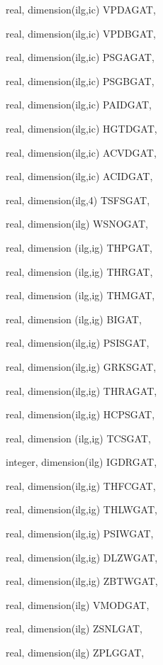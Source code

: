 {\begin{DoxyParamCaption}
\item[{real, dimension(ilg,ic)}]{V\+P\+D\+A\+G\+A\+T, }
\item[{real, dimension(ilg,ic)}]{V\+P\+D\+B\+G\+A\+T, }
\item[{real, dimension(ilg,ic)}]{P\+S\+G\+A\+G\+A\+T, }
\item[{real, dimension(ilg,ic)}]{P\+S\+G\+B\+G\+A\+T, }
\item[{real, dimension(ilg,ic)}]{P\+A\+I\+D\+G\+A\+T, }
\item[{real, dimension(ilg,ic)}]{H\+G\+T\+D\+G\+A\+T, }
\item[{real, dimension(ilg,ic)}]{A\+C\+V\+D\+G\+A\+T, }
\item[{real, dimension(ilg,ic)}]{A\+C\+I\+D\+G\+A\+T, }
\item[{real, dimension(ilg,4)}]{T\+S\+F\+S\+G\+A\+T, }
\item[{real, dimension(ilg)}]{W\+S\+N\+O\+G\+A\+T, }
\item[{real, dimension (ilg,ig)}]{T\+H\+P\+G\+A\+T, }
\item[{real, dimension (ilg,ig)}]{T\+H\+R\+G\+A\+T, }
\item[{real, dimension (ilg,ig)}]{T\+H\+M\+G\+A\+T, }
\item[{real, dimension  (ilg,ig)}]{B\+I\+G\+A\+T, }
\item[{real, dimension(ilg,ig)}]{P\+S\+I\+S\+G\+A\+T, }
\item[{real, dimension(ilg,ig)}]{G\+R\+K\+S\+G\+A\+T, }
\item[{real, dimension(ilg,ig)}]{T\+H\+R\+A\+G\+A\+T, }
\item[{real, dimension(ilg,ig)}]{H\+C\+P\+S\+G\+A\+T, }
\item[{real, dimension (ilg,ig)}]{T\+C\+S\+G\+A\+T, }
\item[{integer, dimension(ilg)}]{I\+G\+D\+R\+G\+A\+T, }
\item[{real, dimension(ilg,ig)}]{T\+H\+F\+C\+G\+A\+T, }
\item[{real, dimension(ilg,ig)}]{T\+H\+L\+W\+G\+A\+T, }
\item[{real, dimension(ilg,ig)}]{P\+S\+I\+W\+G\+A\+T, }
\item[{real, dimension(ilg,ig)}]{D\+L\+Z\+W\+G\+A\+T, }
\item[{real, dimension(ilg,ig)}]{Z\+B\+T\+W\+G\+A\+T, }
\item[{real, dimension(ilg)}]{V\+M\+O\+D\+G\+A\+T, }
\item[{real, dimension(ilg)}]{Z\+S\+N\+L\+G\+A\+T, }
\item[{real, dimension(ilg)}]{Z\+P\+L\+G\+G\+A\+T, }

\end{DoxyParamCaption}}
